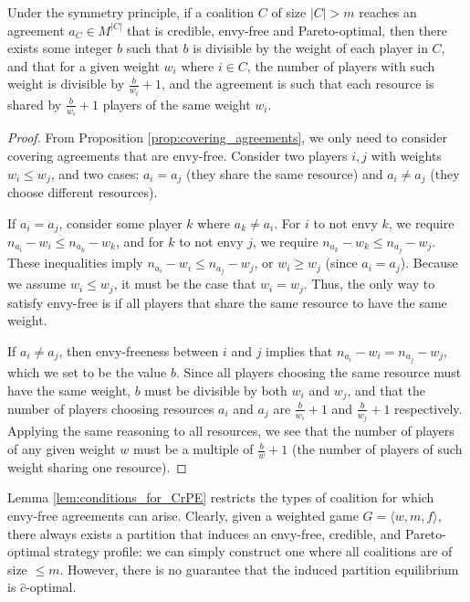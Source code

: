 \begin{lemma} \label{lem:conditions_for_CrPE}
    Under the symmetry principle, if a coalition $C$ of size $|C| > m$ reaches an agreement $a_C \in M^{|C|}$ that is credible, envy-free and Pareto-optimal, then there exists some integer $b$ such that $b$ is divisible by the weight of each player in $C$, and that for a given weight $w_i$ where $i \in C$, the number of players with such weight is divisible by $\frac{b}{w_i} + 1$, and the agreement is such that each resource is shared by $\frac{b}{w_i} + 1$ players of the same weight $w_i$. 
\end{lemma}

\begin{proof}
    From Proposition \ref{prop:covering_agreements}, we only need to consider covering agreements that are envy-free. Consider two players $i, j$ with weights $w_i \leq w_j$, and two cases: $a_i = a_j$ (they share the same resource) and $a_i \neq a_j$ (they choose different resources). 

    If $a_i = a_j$, consider some player $k$ where $a_k \neq a_i$. For $i$ to not envy $k$, we require $n_{a_i} - w_i \leq n_{a_k} - w_k$, and for $k$ to not envy $j$, we require $n_{a_k} - w_k \leq n_{a_j} - w_j$. These inequalities imply $n_{a_i} - w_i \leq n_{a_j} - w_j$, or $w_i \geq w_j$ (since $a_i = a_j$). Because we assume $w_i \leq w_j$, it must be the case that $w_i = w_j$. Thus, the only way to satisfy envy-free is if all players that share the same resource to have the same weight. 

    If $a_i \neq a_j$, then envy-freeness between $i$ and $j$ implies that $n_{a_i} - w_i = n_{a_j} - w_j$, which we set to be the value $b$. Since all players choosing the same resource must have the same weight, $b$ must be divisible by both $w_i$ and $w_j$, and that the number of players choosing resources $a_i$ and $a_j$ are $\frac{b}{w_i} + 1$ and $\frac{b}{w_j} + 1$ respectively. Applying the same reasoning to all resources, we see that the number of players of any given weight $w$ must be a multiple of $\frac{b}{w} + 1$ (the number of players of such weight sharing one resource).
\end{proof}

Lemma \ref{lem:conditions_for_CrPE} restricts the types of coalition for which envy-free agreements can arise. Clearly, given a weighted game $G = \langle w, m, f \rangle$, there always exists a partition that induces an envy-free, credible, and Pareto-optimal strategy profile: we can simply construct one where all coalitions are of size $\leq m$. However, there is no guarantee that the induced partition equilibrium is $\hat c$-optimal.

